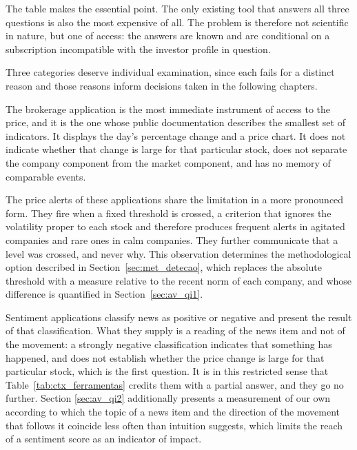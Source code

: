 The table makes the essential point. The only existing tool that answers all three questions is
also the most expensive of all. The problem is therefore not scientific in nature, but one of access: the
answers are known and are conditional on a subscription incompatible with the investor profile in
question.

Three categories deserve individual examination, since each fails for a distinct reason and those
reasons inform decisions taken in the following chapters.

The brokerage application is the most immediate instrument of access to the price, and it is the
one whose public documentation describes the smallest set of indicators. It displays the day's
percentage change and a price chart. It does not indicate whether that change is large for that
particular stock, does not separate the company component from the market component, and has no
memory of comparable events.

The price alerts of these applications share the limitation in a more pronounced form. They fire
when a fixed threshold is crossed, a criterion that ignores the volatility proper to each stock and
therefore produces frequent alerts in agitated companies and rare ones in calm companies. They
further communicate that a level was crossed, and never why. This observation determines the
methodological option described in Section~\ref{sec:met_detecao}, which replaces the absolute
threshold with a measure relative to the recent norm of each company, and whose difference is
quantified in Section~\ref{sec:av_qi1}.

Sentiment applications classify news as positive or negative and present the result of that
classification. What they supply is a reading of the news item and not of the movement: a
strongly negative classification indicates that something has happened, and does not establish
whether the price change is large for that particular stock, which is the first question. It is
in this restricted sense that Table~\ref{tab:ctx_ferramentas} credits them with a partial
answer, and they go no further. Section
\ref{sec:av_qi2} additionally presents a measurement of our own according to which the topic of a
news item and the direction of the movement that follows it coincide less often than intuition
suggests, which limits the reach of a sentiment score as an indicator of impact.

